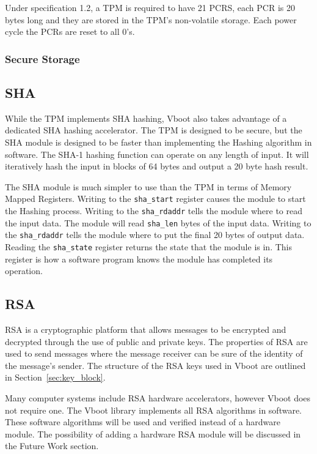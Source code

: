\documentclass[../report.tex]{subfiles}
\def\code#1{\texttt{#1}}
\begin{document}
Under specification 1.2, a TPM is required to have 21 PCRS, each PCR is 20 bytes
long and they are stored in the TPM's non-volatile storage.
Each power cycle the PCRs are reset to all 0's.

\subsubsection{Secure Storage}


\subsection{SHA}

While the TPM implements SHA hashing, Vboot also takes advantage of a dedicated
SHA hashing accelerator. 
The TPM is designed to be secure, but the SHA module is designed to be faster
than implementing the Hashing algorithm in software.
The SHA-1 hashing function can operate on any length of input.
It will iteratively hash the input in blocks of 64 bytes and output a 20 byte
hash result.


The SHA module is much simpler to use than the TPM in terms of Memory Mapped
Registers. 
Writing to the  \code{sha\_start} register causes the module to start the
Hashing process.
Writing to the \code{sha\_rdaddr} tells the module where to read the input data.
The module will read \code{sha\_len} bytes of the input data.
Writing to the \code{sha\_rdaddr} tells the module where to put the final 20
bytes of output data.
Reading the \code{sha\_state} register returns the state that the module is in.
This register is how a software program knows the module has completed its
operation.

\subsection{RSA}

RSA is a cryptographic platform that allows messages to be encrypted and
decrypted through the use of public and private keys.
The properties of RSA are used to send messages where the message receiver can
be sure of the identity of the message's sender. 
The structure of the RSA keys used in Vboot are outlined in
Section~\ref{sec:key_block}.

Many computer systems include RSA hardware accelerators, however Vboot does not
require one. 
The Vboot library implements all RSA algorithms in software.
These software algorithms will be used and verified instead of a hardware
module.
The possibility of adding a hardware RSA module will be discussed in the Future
Work section.
\end{document}
